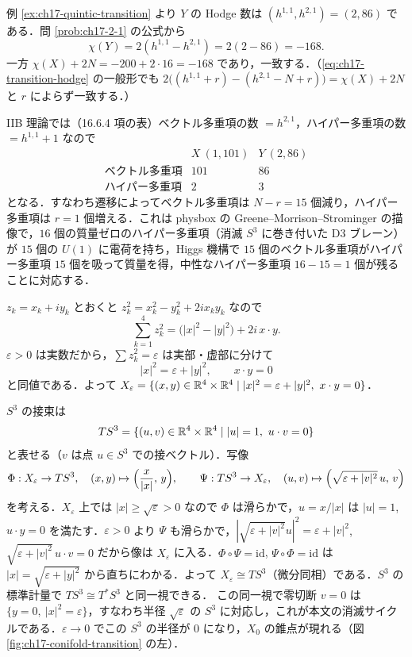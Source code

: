 例 \ref{ex:ch17-quintic-transition} より $Y$ の Hodge 数は $(h^{1,1},h^{2,1})=(2,86)$ である．問 \ref{prob:ch17-2-1} の公式から
\[
\chi(Y)=2(h^{1,1}-h^{2,1})=2(2-86)=-168 .
\]
一方 $\chi(X)+2N=-200+2\cdot16=-168$ であり，一致する．（\eqref{eq:ch17-transition-hodge} の一般形でも $2\bigl((h^{1,1}+r)-(h^{2,1}-N+r)\bigr)=\chi(X)+2N$ と $r$ によらず一致する．）

IIB 理論では（16.6.4 項の表）ベクトル多重項の数 $=h^{2,1}$，ハイパー多重項の数 $=h^{1,1}+1$ なので
\[
\begin{array}{lcc}
 & X\ (1,101) & Y\ (2,86)\\\hline
\text{ベクトル多重項} & 101 & 86\\
\text{ハイパー多重項} & 2 & 3
\end{array}
\]
となる．すなわち遷移によってベクトル多重項は $N-r=15$ 個減り，ハイパー多重項は $r=1$ 個増える．これは physbox の Greene--Morrison--Strominger の描像で，$16$ 個の質量ゼロのハイパー多重項（消滅 $S^3$ に巻き付いた D3 ブレーン）が $15$ 個の $U(1)$ に電荷を持ち，Higgs 機構で $15$ 個のベクトル多重項がハイパー多重項 $15$ 個を吸って質量を得，中性なハイパー多重項 $16-15=1$ 個が残ることに対応する．

$z_k=x_k+iy_k$ とおくと $z_k^2=x_k^2-y_k^2+2ix_ky_k$ なので
\[
\sum_{k=1}^4z_k^2=\bigl(|x|^2-|y|^2\bigr)+2i\,x\cdot y .
\]
$\varepsilon>0$ は実数だから，$\sum z_k^2=\varepsilon$ は実部・虚部に分けて
\[
|x|^2=\varepsilon+|y|^2,\qquad x\cdot y=0
\]
と同値である．よって $X_\varepsilon=\{(x,y)\in\R^4\times\R^4\mid|x|^2=\varepsilon+|y|^2,\ x\cdot y=0\}$．

$S^3$ の接束は
\[
TS^3=\{(u,v)\in\mathbb{R}^4\times\mathbb{R}^4\mid |u|=1,\ u\cdot v=0\}
\]
と表せる（$v$ は点 $u\in S^3$ での接ベクトル）．写像
\[
\Phi:X_\varepsilon\to TS^3,\quad (x,y)\mapsto\Bigl(\frac{x}{|x|},\,y\Bigr),\qquad
\Psi:TS^3\to X_\varepsilon,\quad (u,v)\mapsto\Bigl(\sqrt{\varepsilon+|v|^2}\,u,\,v\Bigr)
\]
を考える．$X_\varepsilon$ 上では $|x|\ge\sqrt\varepsilon>0$ なので $\Phi$ は滑らかで，$u=x/|x|$ は $|u|=1$, $u\cdot y=0$ を満たす．$\varepsilon>0$ より $\Psi$ も滑らかで，$|\sqrt{\varepsilon+|v|^2}u|^2=\varepsilon+|v|^2$, $\sqrt{\varepsilon+|v|^2}\,u\cdot v=0$ だから像は $X_\varepsilon$ に入る．$\Phi\circ\Psi=\mathrm{id}$, $\Psi\circ\Phi=\mathrm{id}$ は $|x|=\sqrt{\varepsilon+|y|^2}$ から直ちにわかる．よって $X_\varepsilon\cong TS^3$（微分同相）である．$S^3$ の標準計量で $TS^3\cong T^*S^3$ と同一視できる．
この同一視で零切断 $v=0$ は $\{y=0,\ |x|^2=\varepsilon\}$，すなわち半径 $\sqrt\varepsilon$ の $S^3$ に対応し，これが本文の消滅サイクルである．$\varepsilon\to0$ でこの $S^3$ の半径が $0$ になり，$X_0$ の錐点が現れる（図 \ref{fig:ch17-conifold-transition} の左）．

